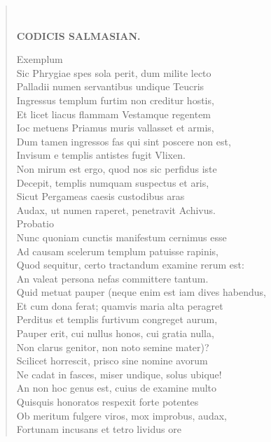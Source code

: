 \documentclass[11pt, a4paper]{report}
\begin{document}
\begin{verse}
        ﻿\pagebreak 
    \begin{center} \textbf{CODICIS SALMASIAN.} \end{center} \marginpar{[91]} Exemplum \\ Sic Phrygiae spes sola perit, dum milite lecto \\ Palladii numen servantibus undique Teucris \\ Ingressus templum furtim non creditur hostis, \\ Et licet liacus flammam Vestamque regentem \\ Ioc metuens Priamus muris vallasset et armis, \\ Dum tamen ingressos fas qui sint poscere non est, \\ Invisum e templis antistes fugit Vlixen. \\ Non mirum est ergo, quod nos sic perfidus iste \\ Decepit, templis numquam suspectus et aris, \\ Sicut Pergameas caesis custodibus aras \\ Audax, ut numen raperet, penetravit Achivus. \\  \lbrack Probatio \rbrack  \\ Nunc quoniam cunctis manifestum cernimus esse \\ Ad causam scelerum templum patuisse rapinis, \\ Quod sequitur, certo tractandum examine rerum est: \\ An valeat persona nefas committere tantum. \\ Quid metuat pauper (neque enim est iam dives habendus, \\ Et cum dona ferat; quamvis maria alta peragret \\ Perditus et templis furtivum congreget aurum, \\ Pauper erit, cui nullus honos, cui gratia nulla, \\ Non clarus genitor, non noto semine mater)? \\ Scilicet horrescit, prisco sine nomine avorum \\ Ne cadat in fasces, miser undique, solus ubique! \\ An non hoc genus est, cuius de examine multo \\ Quisquis honoratos respexit forte potentes \\ Ob meritum fulgere viros, mox improbus, audax, \\ Fortunam incusans et tetro lividus ore \\ 

\end{verse}
\end{document}
